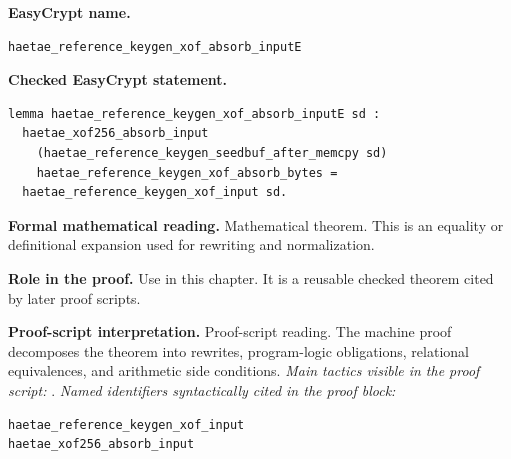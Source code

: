 \begin{formaltheorem}
\noindent\textbf{EasyCrypt name.}
\begin{lstlisting}[language=EasyCrypt,basicstyle=\ttfamily\scriptsize]
haetae_reference_keygen_xof_absorb_inputE
\end{lstlisting}
\noindent\textbf{Checked EasyCrypt statement.}
\begin{lstlisting}[language=EasyCrypt,basicstyle=\ttfamily\scriptsize]
lemma haetae_reference_keygen_xof_absorb_inputE sd :
  haetae_xof256_absorb_input
    (haetae_reference_keygen_seedbuf_after_memcpy sd)
    haetae_reference_keygen_xof_absorb_bytes =
  haetae_reference_keygen_xof_input sd.
\end{lstlisting}
\noindent\textbf{Formal mathematical reading.}
Mathematical theorem. This is an equality or definitional expansion used for rewriting and normalization.

\noindent\textbf{Role in the proof.}
Use in this chapter. It is a reusable checked theorem cited by later proof scripts.

\noindent\textbf{Proof-script interpretation.}
Proof-script reading. The machine proof decomposes the theorem into rewrites, program-logic obligations, relational equivalences, and arithmetic side conditions.
\emph{Main tactics visible in the proof script:} .
\emph{Named identifiers syntactically cited in the proof block:}
\begin{lstlisting}[language=EasyCrypt,basicstyle=\ttfamily\scriptsize]
haetae_reference_keygen_xof_input
haetae_xof256_absorb_input
\end{lstlisting}

\end{formaltheorem}

